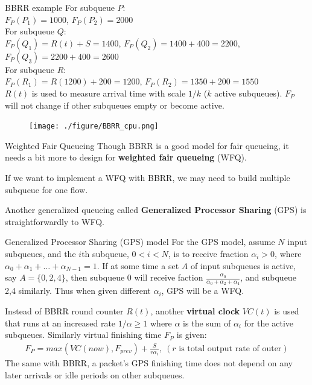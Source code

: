 \documentclass[10pt]{beamer}
\begin{document}
\begin{frame}{BBRR example}
For subqueue $P$: \\
$F_P(P_1) = 1000$, 
$F_P(P_2) = 2000$ \\
For subqueue $Q$: \\
$F_P(Q_1) = R(t) + S = 1400$, 
$F_P(Q_2) = 1400+400 = 2200$, 
$F_P(Q_3) = 2200+400 = 2600$\\
For subqueue $R$: \\
$F_P(R_1) = R(1200)+200 = 1200$,
$F_P(R_2) = 1350+200 = 1550$ \\
$R(t)$ is used to measure arrival time with scale $1/k$ ($k$ active subqueues). $F_P$ will not change if other subqueues empty or become active.
\begin{figure}
\texttt{[image: ./figure/BBRR\_cpu.png]}
\end{figure}
\end{frame}

\begin{frame}{Weighted Fair Queueing}
Though BBRR is a good model for fair queueing, it needs a bit more to design for \textbf{weighted fair queueing} (WFQ).

If we want to implement a WFQ with BBRR, we may need to build multiple subqueue for one flow. 

Another generalized queueing called \textbf{Generalized Processor Sharing} (GPS) is straightforwardly to WFQ. 
\end{frame}

\begin{frame}{Generalized Processor Sharing (GPS) model}
For the GPS model, assume $N$ input subqueues, and the $i$th subqueue, $0<i<N$, is to receive fraction $\alpha_i>0$, where $\alpha_0+\alpha_1+\ldots+\alpha_{N-1}=1$.
If at some time a set $A$ of input subqueues is active, say $A=\lbrace 0,2,4\rbrace$, then subqueue 0 will receive faction $\frac{\alpha_0}{\alpha_0+\alpha_2+\alpha_4}$, and subqueue 2,4 similarly.
Thus when given different $\alpha_i$, GPS will be a WFQ.

Instead of BBRR round counter $R(t)$, another \textbf{virtual clock} $VC(t)$ is used that runs at an increased rate $1/\alpha\geq 1$ where $\alpha$ is the sum of $\alpha_i$ for the active subqueues. 
Similarly virtual finishing time $F_P$ is given:
\begin{align}
F_P = max(VC(now), F_{prev}) + \frac{S}{r\alpha_i},\ (r \text{ is total output rate of outer})
\end{align}
The same with BBRR, a packet's GPS finishing time does not depend on any later arrivals or idle periods on other subqueues. 
\end{frame}
\end{document}
